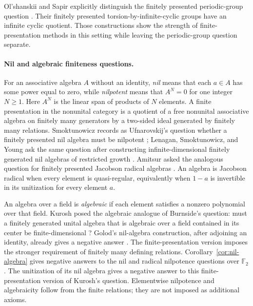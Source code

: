 \documentclass[11pt]{article}
\numberwithin{equation}{section}
\theoremstyle{definition}
\theoremstyle{remark}
\newcommand{\F}{\mathbb F}
\begin{document}
Ol'shanskii and Sapir explicitly distinguish the finitely presented
periodic-group question \cite[p.~45]{OlshanskiiSapir2003}. Their
finitely presented torsion-by-infinite-cyclic groups
\cite[Theorem~1.1]{OlshanskiiSapir2003} have an infinite cyclic
quotient. Those constructions show the strength of finite-presentation
methods in this setting while leaving the periodic-group question
separate.

\paragraph{Nil and algebraic finiteness questions.}
For an associative algebra $A$ without an identity, \emph{nil} means that
each $a\in A$ has some power equal to zero, while \emph{nilpotent} means
that $A^N=0$ for one integer $N\geq1$. Here $A^N$ is the linear span of
products of $N$ elements. A finite presentation in the nonunital category
is a quotient of a free nonunital associative algebra on finitely many
generators by a two-sided ideal generated by finitely many relations.
Smoktunowicz records as Ufnarovskij's question whether a finitely presented
nil algebra must be nilpotent \cite[Question~8.1]{Smoktunowicz2008};
Lenagan, Smoktunowicz, and Young ask the same question after constructing
infinite-dimensional finitely generated nil algebras of restricted growth
\cite[Section~9]{LenaganSmoktunowiczYoung2012}. Amitsur asked the analogous
question for finitely presented Jacobson radical algebras
\cite[Section~8]{Smoktunowicz2008}. An algebra is Jacobson radical when
every element is quasi-regular, equivalently when $1-a$ is invertible in
its unitization for every element $a$.

An algebra over a field is \emph{algebraic} if each element satisfies a
nonzero polynomial over that field. Kurosh posed the algebraic analogue
of Burnside's question: must a finitely generated unital algebra that is
algebraic over a field contained in its center be finite-dimensional
\cite[p.~240, Problem~(R)]{Kurosh1941}? Golod's nil-algebra construction,
after adjoining an identity, already gives a negative answer
\cite{Golod1964,LenaganSmoktunowiczYoung2012}. The finite-presentation
version imposes the stronger requirement of finitely many defining
relations. Corollary~\ref{cor:nil-algebra} gives negative answers to the
nil and radical nilpotence questions over $\F_2$. The unitization of its
nil algebra gives a negative answer to this finite-presentation version of
Kurosh's question. Elementwise nilpotence and algebraicity follow from the
finite relations; they are not imposed as additional axioms.
\end{document}
